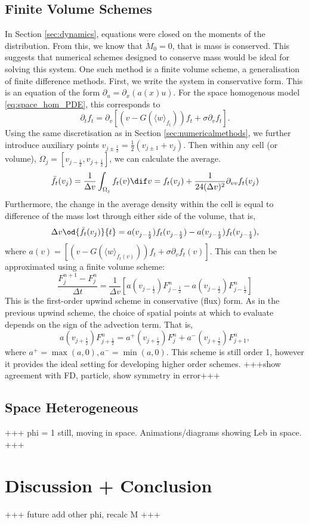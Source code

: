 \documentclass[11pt, a4paper, draft]{article}
\newcommand{\Dt}{\Delta t}
\newcommand{\Dv}{\Delta v}
\begin{document}
        \subsection{Finite Volume Schemes}
            In Section \ref{sec:dynamics}, equations were closed on the moments of the distribution. From this, we know that \(\dot{M}_0 = 0\), that is mass is conserved. This suggests that numerical schemes designed to conserve mass would be ideal for solving this system. One such method is a finite volume scheme, a generalisation of finite difference methods. First, we write the system in conservative form. This is an equation of the form $\partial_ u = \partial_x(a(x)u)$. For the space homogenous model \eqref{eq:space_hom_PDE}, this corresponds to
            \begin{equation}\label{eq:flux_space_hom}
                \partial_t f_t = \partial_v \left[\left(v-G(\langle w \rangle_{f_t})\right)f_t + \sigma \partial_v f_t \right].
            \end{equation}
            Using the same discretisation as in Section \ref{sec:numericalmethods}, we further introduce auxiliary points $v_{j\pm\frac{1}{2}} = \frac{1}{2}(v_{j\pm1} + v_j) $. Then within any cell (or volume), $\Omega_j = [v_{j-\frac{1}{2}}, v_{j+\frac{1}{2}}]$, we can calculate the average.
            \[
                 \bar{f}_t(v_j) = \frac{1}{\Dv}\int_{\Omega_j} f_t(v) \dif v = f_t(v_j)+\frac{1}{24(\Dv)^2} \partial_{vv} f_t(v_j)
             \]
            Furthermore, the change in the average density within the cell is equal to difference of the mass lost through either side of the volume, that is,
            \[
                \Dv\od{\bar{f}_t(v_j)}{t} = a(v_{j-\frac{1}{2}})f_t(v_{j-\frac{1}{2}}) - a(v_{j-\frac{1}{2}})f_t(v_{j-\frac{1}{2}}), 
            \]
            where $a(v) = \left[\left(v-G(\langle w \rangle_{f_t(v)})\right)f_t + \sigma \partial_v f_t(v) \right]$. This can then be approximated using a finite volume scheme:
            \[
                \frac{F^{n+1}_j - F^n_j}{\Dt} = \frac{1}{\Dv}\left[ a(v_{j-\frac{1}{2}})F^n_{j-\frac{1}{2}} - a(v_{j-\frac{1}{2}})F^n_{j-\frac{1}{2}}\right]
            \]
            This is the first-order upwind scheme in conservative (flux) form. As in the previous upwind scheme, the choice of spatial points at which to evaluate depends on the sign of the advection term. That is,
            \[
                a(v_{j+\frac{1}{2}})F^n_{j+\frac{1}{2}} = a^+(v_{j+\frac{1}{2}})F^n_{j} + a^-(v_{j+\frac{1}{2}})F^n_{j+1},
            \]
            where $a^+ = \max(a,0), a^- = \min(a,0)$.  This scheme is still order 1, however it provides the ideal setting for developing higher order schemes.
            +++show agreement with FD, particle,  show symmetry in error+++
        \subsection{Space Heterogeneous}
        +++ phi = 1 still, moving in space. Animations/diagrams showing Leb in space. +++
        
        \section{Discussion + Conclusion}
        +++ future add other phi, recalc M +++
	
	
	\appendix
\end{document}
